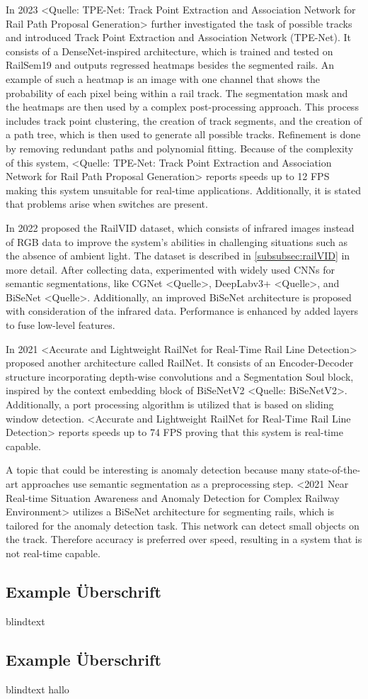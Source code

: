 In 2023 <Quelle: TPE-Net: Track Point Extraction and Association Network for Rail Path Proposal Generation> further investigated the task of possible tracks and introduced Track Point Extraction and Association Network (TPE-Net).
It consists of a DenseNet-inspired architecture, which is trained and tested on RailSem19 and outputs regressed heatmaps besides the segmented rails.
An example of such a heatmap is an image with one channel that shows the probability of each pixel being within a rail track.
The segmentation mask and the heatmaps are then used by a complex post-processing approach.
This process includes track point clustering, the creation of track segments, and the creation of a path tree, which is then used to generate all possible tracks.
Refinement is done by removing redundant paths and polynomial fitting.
Because of the complexity of this system, <Quelle: TPE-Net: Track Point Extraction and Association Network for Rail Path Proposal Generation> reports speeds up to 12 \ac{FPS} making this system unsuitable for real-time applications.
Additionally, it is stated that problems arise when switches are present.

In 2022 \cite{yuan2022railvid} proposed the RailVID dataset, which consists of infrared images instead of \ac{RGB} data to improve the system's abilities in challenging situations such as the absence of ambient light.
The dataset is described in \autoref{subsubsec:railVID} in more detail.
After collecting data, \cite{yuan2022railvid} experimented with widely used \ac{CNN}s for semantic segmentations, like CGNet <Quelle>, DeepLabv3+ <Quelle>, and BiSeNet <Quelle>.
Additionally, an improved BiSeNet architecture is proposed with consideration of the infrared data. Performance is enhanced by added layers to fuse low-level features.

In 2021 <Accurate and Lightweight RailNet for Real-Time Rail Line Detection> proposed another architecture called RailNet.
It consists of an Encoder-Decoder structure incorporating depth-wise convolutions and a Segmentation Soul block, inspired by the context embedding block of BiSeNetV2 <Quelle: BiSeNetV2>.
Additionally, a port processing algorithm is utilized that is based on sliding window detection.
<Accurate and Lightweight RailNet for Real-Time Rail Line Detection> reports speeds up to 74 \ac{FPS} proving that this system is real-time capable.

A topic that could be interesting is anomaly detection because many state-of-the-art approaches use semantic segmentation as a preprocessing step.
<2021 Near Real-time Situation Awareness and Anomaly Detection for Complex Railway Environment> utilizes a BiSeNet architecture for segmenting rails, which is tailored for the anomaly detection task.
This network can detect small objects on the track.
Therefore accuracy is preferred over speed, resulting in a system that is not real-time capable.

\subsection{Example Überschrift}

blindtext

\subsection{Example Überschrift}

blindtext hallo